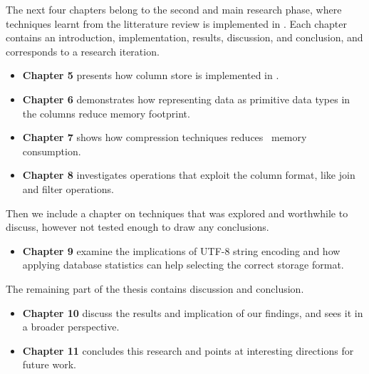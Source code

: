 
The next four chapters belong to the second and main research phase, where techniques learnt from the litterature review is implemented in \gap. Each chapter contains an introduction, implementation, results, discussion, and conclusion, and corresponds to a research iteration. 
\begin{itemize}
    \item \textbf{Chapter 5} presents how column store is implemented in \gap.
    \item \textbf{Chapter 6} demonstrates how representing data as primitive data types in the columns reduce memory footprint.
    \item \textbf{Chapter 7} shows how compression techniques reduces \gap~memory consumption.
    \item \textbf{Chapter 8} investigates operations that exploit the column format, like join and filter operations.
\end{itemize}

Then we include a chapter on techniques that was explored and worthwhile to discuss, however not tested enough to draw any conclusions.

\begin{itemize}
    \item \textbf{Chapter 9} examine the implications of UTF-8 string encoding and how applying database statistics can help selecting the correct storage format.
\end{itemize}

The remaining part of the thesis contains discussion and conclusion.
\begin{itemize}
  \item \textbf{Chapter 10} discuss the results and implication of our findings, and sees it in a broader perspective. 
  \item \textbf{Chapter 11} concludes this research and points at interesting directions for future work.
\end{itemize}



